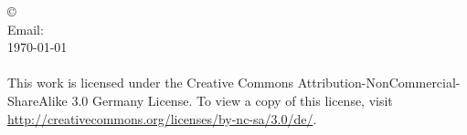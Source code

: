 \thispagestyle{empty}

\null

\vfill

\noindent
\copyright{} \docauthor\\
\noindent Email:~\authormail{}\\
\today{}\\\\
This work is licensed under the Creative Commons Attribution-Non\-Commercial-Share\-Alike 3.0 Germany License. To view a copy of this license, visit \url{http://creativecommons.org/licenses/by-nc-sa/3.0/de/}.
